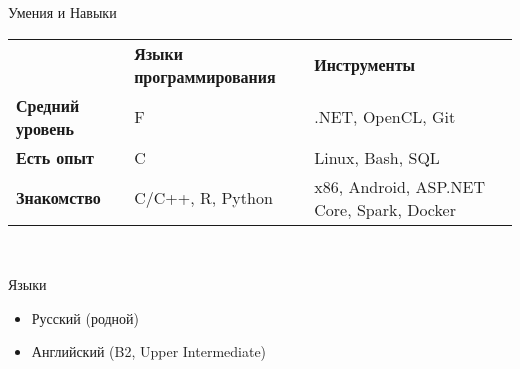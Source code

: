 \documentclass{resume} %
\newcommand{\Fsh}{F{\newcommand{\lserif{}}\#}\ }
\newcommand{\Csh}{C{\newcommand{\lserif{}}\#}\ }
\begin{document}
\begin{rSection}{Умения и Навыки}



\begin{tabular}{l l l}
& \textbf{Языки программирования} & \textbf{Инструменты} \\ 
\textbf{Средний уровень} & \Fsh & .NET, OpenCL, Git \\
\textbf{Есть опыт} & \Csh, Scala & Linux, Bash, SQL  \\
\textbf{Знакомство} & C/C++, R, Python & x86, Android, ASP.NET Core, Spark, Docker \\
\end{tabular}
\\
\end{rSection}

\begin{rSection}{Языки}
\begin{itemize}
\item Русский (родной)
\item Английский (B2, Upper Intermediate)
\end{itemize}
\end{rSection}
\end{document}
